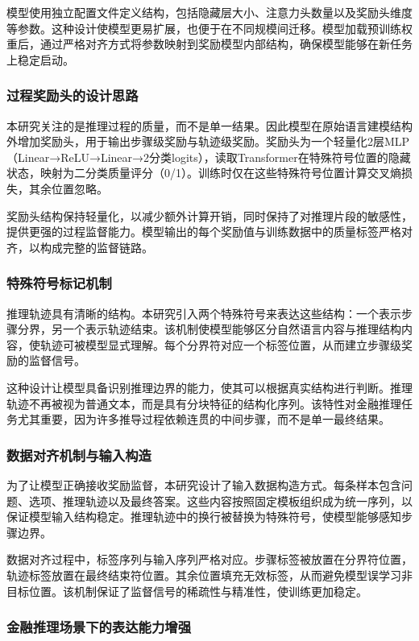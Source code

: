 \documentclass[professional,privacy,print,win,long,STEM,AutoFakeBold]{def/buaa}
\begin{document}
模型使用独立配置文件定义结构，包括隐藏层大小、注意力头数量以及奖励头维度等参数。这种设计使模型更易扩展，也便于在不同规模间迁移。模型加载预训练权重后，通过严格对齐方式将参数映射到奖励模型内部结构，确保模型能够在新任务上稳定启动。

\subsubsection{过程奖励头的设计思路}

本研究关注的是推理过程的质量，而不是单一结果。因此模型在原始语言建模结构外增加奖励头，用于输出步骤级奖励与轨迹级奖励。奖励头为一个轻量化2层MLP（Linear→ReLU→Linear→2分类logits），读取Transformer在特殊符号位置的隐藏状态，映射为二分类质量评分（0/1）。训练时仅在这些特殊符号位置计算交叉熵损失，其余位置忽略。

奖励头结构保持轻量化，以减少额外计算开销，同时保持了对推理片段的敏感性，提供更强的过程监督能力。模型输出的每个奖励值与训练数据中的质量标签严格对齐，以构成完整的监督链路。

\subsubsection{特殊符号标记机制}

推理轨迹具有清晰的结构。本研究引入两个特殊符号来表达这些结构：一个表示步骤分界，另一个表示轨迹结束。该机制使模型能够区分自然语言内容与推理结构内容，使轨迹可被模型显式理解。每个分界符对应一个标签位置，从而建立步骤级奖励的监督信号。

这种设计让模型具备识别推理边界的能力，使其可以根据真实结构进行判断。推理轨迹不再被视为普通文本，而是具有分块特征的结构化序列。该特性对金融推理任务尤其重要，因为许多推导过程依赖连贯的中间步骤，而不是单一最终结果。

\subsubsection{数据对齐机制与输入构造}

为了让模型正确接收奖励监督，本研究设计了输入数据构造方式。每条样本包含问题、选项、推理轨迹以及最终答案。这些内容按照固定模板组织成为统一序列，以保证模型输入结构稳定。推理轨迹中的换行被替换为特殊符号，使模型能够感知步骤边界。

数据对齐过程中，标签序列与输入序列严格对应。步骤标签被放置在分界符位置，轨迹标签放置在最终结束符位置。其余位置填充无效标签，从而避免模型误学习非目标位置。该机制保证了监督信号的稀疏性与精准性，使训练更加稳定。

\subsubsection{金融推理场景下的表达能力增强}
\end{document}
